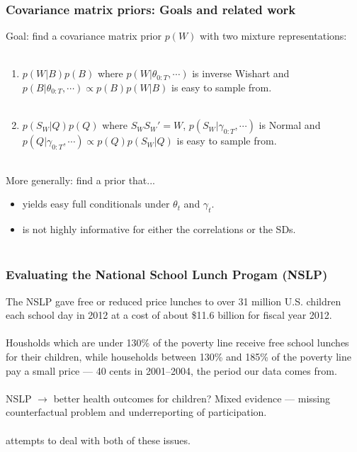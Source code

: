 \documentclass[xcolor=dvipsnames]{beamer}
\begin{document}
\begin{frame}
\frametitle{Covariance matrix priors: Goals and related work}
Goal: find a covariance matrix prior $p(W)$ with two mixture representations:\\~
\begin{enumerate}
\item $p(W|B)p(B)$ where $p(W|\theta_{0:T},\cdots)$ is inverse Wishart and $p(B|\theta_{0:T},\cdots)\propto p(B)p(W|B)$ is easy to sample from.\\~
\item $p(S_W|Q)p(Q)$ where $S_WS_W'=W$, $p(S_W|\gamma_{0:T},\cdots)$ is Normal and $p(Q|\gamma_{0:T},\cdots)\propto p(Q)p(S_W|Q)$ is easy to sample from.\\~
\end{enumerate}
\pause More generally: find a prior that...
\begin{itemize}
\item yields easy full conditionals under $\theta_t$ and $\gamma_t$.
\item is not highly informative for either the correlations or the SDs.\\~
\end{itemize}

\end{frame}

\begin{frame}
  \frametitle{Evaluating the National School Lunch Progam (NSLP)}
The NSLP gave free or reduced price lunches to over 31 million U.S. children each school day in 2012 at a cost of about \$11.6 billion for fiscal year 2012.\\~\\

Housholds which are under 130\% of the poverty line receive free school lunches for their children, while households between 130\% and 185\% of the poverty line pay a small price --- 40 cents in 2001--2004, the period our data comes from.\\~\\

NSLP $\to$ better health outcomes for children? Mixed evidence --- missing counterfactual problem and underreporting of participation.\\~\\

\citet{gundersen2012impact} attempts to deal with both of these issues.

\end{frame}
\end{document}
